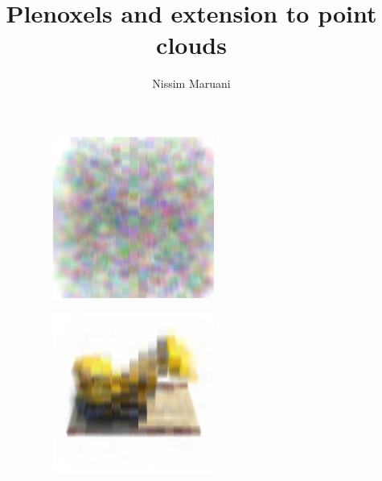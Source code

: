 \documentclass{article}
\title{Plenoxels and extension to point clouds}
\author{Nissim Maruani}
\begin{document}
\maketitle


\begin{figure}[!h]
 \centering
\begin{subfigure}{.19\textwidth}
  \centering
  \includegraphics[width=\linewidth]{figs/model0.png}  
\end{subfigure}
\begin{subfigure}{.19\textwidth}
  \centering
  \includegraphics[width=\linewidth]{figs/model1.png}  

\end{subfigure}
\end{figure}
\end{document}
